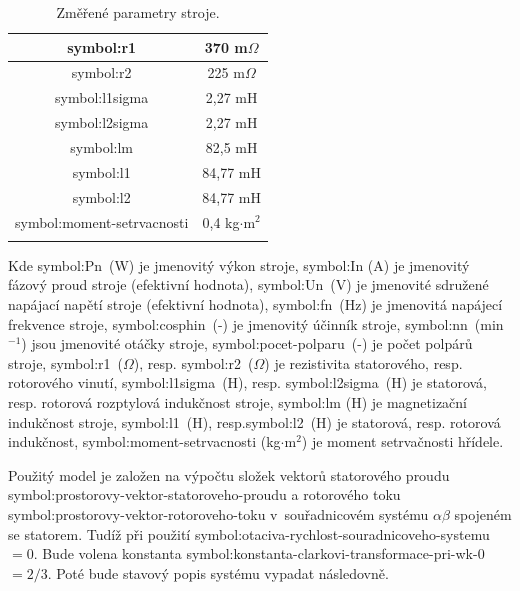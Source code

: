 \documentclass[a4paper, twoside, 11pt]{article}
\begin{document}
        \begin{minipage}[t]{0.47\textwidth}
            \vspace{0pt}
            \begin{table}[H]
                \caption{Změřené parametry stroje.}
                \centering
                    \begin{tabular}{!{\vrule width 2pt} c | c !{\vrule width 2pt}}
                        \gls{symbol:r1} & 370 m$\Omega$ \\ \hline
                        \gls{symbol:r2} & 225 m$\Omega$ \\ \hline
                        \gls{symbol:l1sigma} & 2,27 mH \\ \hline
                        \gls{symbol:l2sigma} & 2,27 mH \\ \hline
                        \gls{symbol:lm} & 82,5 mH \\ \hline
                        \gls{symbol:l1} & 84,77 mH \\ \hline
                        \gls{symbol:l2} & 84,77 mH \\ \hline
						\gls{symbol:moment-setrvacnosti} & 0,4 kg$\cdot$m$^{2}$ \\ 
                    \end{tabular}     
                \label{tab:motor-zmerene-parametry-stroje}
            \end{table}
        \end{minipage}

        \vspace*{1cm}
\noindent Kde \gls{symbol:Pn}~(W) je jmenovitý výkon stroje, \gls{symbol:In} (A) je jmenovitý fázový proud stroje (efektivní hodnota), \gls{symbol:Un}~(V) je jmenovité sdružené napájací napětí stroje (efektivní hodnota), \gls{symbol:fn}~(Hz) je jmenovitá napájecí frekvence stroje, \gls{symbol:cosphin}~(-) je jmenovitý účinník stroje, \gls{symbol:nn}~(min$^{-1}$) jsou jmenovité otáčky stroje, \gls{symbol:pocet-polparu}~(-) je počet polpárů stroje, \gls{symbol:r1}~($\Omega$), resp. \gls{symbol:r2}~($\Omega$) je rezistivita statorového, resp. rotorového vinutí, \gls{symbol:l1sigma}~(H), resp. \gls{symbol:l2sigma}~(H) je statorová, resp. rotorová rozptylová  indukčnost stroje, \gls{symbol:lm} (H) je magnetizační indukčnost stroje, \gls{symbol:l1}~(H), resp.\gls{symbol:l2}~(H) je statorová, resp. rotorová indukčnost, \gls{symbol:moment-setrvacnosti} (kg$\cdot$m$^{2}$) je moment setrvačnosti hřídele.\par
Použitý model je založen na výpočtu složek vektorů statorového proudu \gls{symbol:prostorovy-vektor-statoroveho-proudu} a rotorového toku \gls{symbol:prostorovy-vektor-rotoroveho-toku} v~souřadnicovém systému $\alpha\beta$ spojeném se statorem. Tudíž při použití \gls{symbol:otaciva-rychlost-souradnicoveho-systemu}~$= 0$. Bude volena konstanta \gls{symbol:konstanta-clarkovi-transformace-pri-wk-0}~$= 2/3$. Poté bude stavový popis systému vypadat následovně. \cite{lipcak-bauer-ept-moodle}
\end{document}
